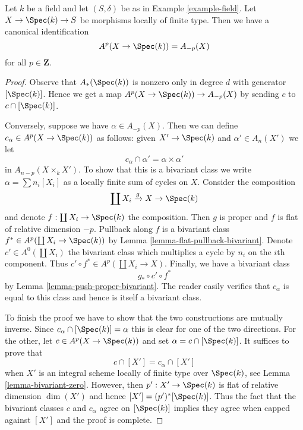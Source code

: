 \begin{lemma}
\label{lemma-chow-cohomology-towards-point}
Let $k$ be a field and let $(S, \delta)$ be as in Example \ref{example-field}.
Let $X \to \Spec(k) \to S$ be morphisms locally of finite type.
Then we have a canonical identification
$$
A^p(X \to \Spec(k)) = A_{-p}(X)
$$
for all $p \in \mathbf{Z}$.
\end{lemma}

\begin{proof}
Observe that $A_*(\Spec(k))$ is nonzero only in degree $d$
with generator $[\Spec(k)]$. Hence we get a map
$A^p(X \to \Spec(k)) \to A_{-p}(X)$ by sending $c$ to
$c \cap [\Spec(k)]$.

\medskip\noindent
Conversely, suppose we have $\alpha \in A_{-p}(X)$.
Then we can define $c_\alpha \in A^p(X \to \Spec(k))$ as
follows: given $X' \to \Spec(k)$ and $\alpha' \in A_n(X')$
we let
$$
c_\alpha \cap \alpha' = \alpha \times \alpha'
$$
in $A_{n - p}(X \times_k X')$. To show that this is a bivariant
class we write $\alpha = \sum n_i[X_i]$ as a locally finite sum
of cycles on $X$. Consider the composition
$$
\coprod X_i \xrightarrow{g} X \to \Spec(k)
$$
and denote $f : \coprod X_i \to \Spec(k)$ the composition.
Then $g$ is proper and $f$ is flat of relative dimension $-p$.
Pullback along $f$ is a bivariant class
$f^* \in A^p(\coprod X_i \to \Spec(k))$ by
Lemma \ref{lemma-flat-pullback-bivariant}.
Denote $c' \in A^0(\coprod X_i)$ the bivariant class
which multiplies a cycle by $n_i$ on the $i$th component.
Thus $c' \circ f^* \in A^p(\coprod X_i \to X)$.
Finally, we have a bivariant class
$$
g_* \circ c' \circ f^*
$$
by Lemma \ref{lemma-push-proper-bivariant}. The reader easily
verifies that $c_\alpha$ is equal to this class and hence
is itself a bivariant class.

\medskip\noindent
To finish the proof we have to show that the two constructions
are mutually inverse. Since $c_\alpha \cap [\Spec(k)] = \alpha$
this is clear for one of the two directions. For the other, let
$c \in A^p(X \to \Spec(k))$ and set $\alpha = c \cap [\Spec(k)]$.
It suffices to prove that
$$
c \cap [X'] = c_\alpha \cap [X']
$$
when $X'$ is an integral scheme locally of finite type over $\Spec(k)$,
see Lemma \ref{lemma-bivariant-zero}. However, then $p' : X' \to \Spec(k)$
is flat of relative dimension $\dim(X')$ and hence
$[X'] = (p')^*[\Spec(k)]$. Thus the fact that the bivariant classes
$c$ and $c_\alpha$ agree on $[\Spec(k)]$ implies they
agree when capped against $[X']$ and the proof is complete.
\end{proof}











